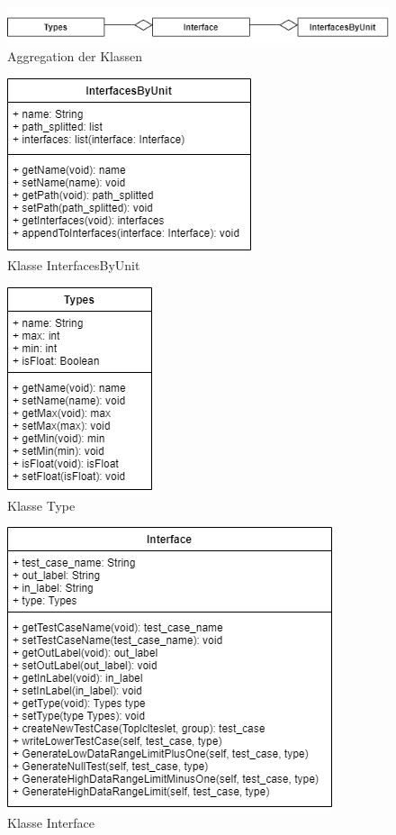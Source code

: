 \begin{figure}[!h]
\centering
\includegraphics[scale=.8,]{Bilder/Quicktest/Klassen/KlasseAggregation.drawio.png}
\caption{Aggregation der Klassen}
\end{figure}
\begin{figure}[!h]
\centering
\includegraphics[scale=.9,]{Bilder/Quicktest/Klassen/KlasseInterfacesByUnit.drawio.png}
\caption{Klasse InterfacesByUnit}
\end{figure}
\begin{figure}[!h]
\centering
\includegraphics[scale=.9,]{Bilder/Quicktest/Klassen/KlasseType.drawio.png}
\caption{Klasse Type}
\end{figure}
\begin{figure}[!h]
\centering
\includegraphics[scale=.9,]{Bilder/Quicktest/Klassen/KlasseInterface.drawio.png}
\caption{Klasse Interface}
\end{figure}